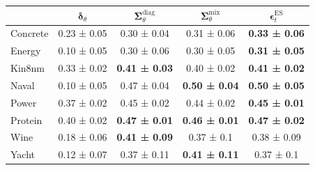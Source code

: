 \begin{tabular}{l|c|c|c|c}
\toprule
 & $\bm\delta_\theta$ & $\bm\Sigma_\theta^{\mathrm{diag}}$ & $\bm\Sigma_\theta^{\mathrm{mix}}$ & $\bm\epsilon_t^\mathrm{ES}$ \\
\midrule
Concrete & 0.23 ± 0.05 & 0.30 ± 0.04 & 0.31 ± 0.06 & \textbf{0.33 ± 0.06} \\
Energy & 0.10 ± 0.05 & 0.30 ± 0.06 & 0.30 ± 0.05 & \textbf{0.31 ± 0.05} \\
Kin8nm & 0.33 ± 0.02 & \textbf{0.41 ± 0.03} & 0.40 ± 0.02 & \textbf{0.41 ± 0.02} \\
Naval & 0.10 ± 0.05 & 0.47 ± 0.04 & \textbf{0.50 ± 0.04} & \textbf{0.50 ± 0.05} \\
Power & 0.37 ± 0.02 & 0.45 ± 0.02 & 0.44 ± 0.02 & \textbf{0.45 ± 0.01} \\
Protein & 0.40 ± 0.02 & \textbf{0.47 ± 0.01} & \textbf{0.46 ± 0.01} & \textbf{0.47 ± 0.02} \\
Wine & 0.18 ± 0.06 & \textbf{0.41 ± 0.09} & 0.37 ± 0.1 & 0.38 ± 0.09 \\
Yacht & 0.12 ± 0.07 & 0.37 ± 0.11 & \textbf{0.41 ± 0.11} & 0.37 ± 0.1 \\
\bottomrule
\end{tabular}
